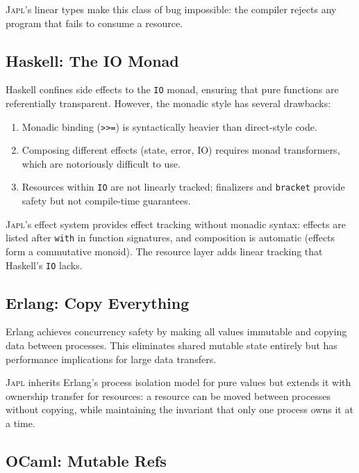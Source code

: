 \documentclass[11pt]{article}
\newcommand{\JAPL}{\textsc{Japl}}
\begin{document}
\JAPL{}'s linear types make this class of bug impossible: the
compiler rejects any program that fails to consume a resource.

\subsection{Haskell: The IO Monad}\label{sec:cmp-haskell}

Haskell confines side effects to the \texttt{IO} monad, ensuring that
pure functions are referentially transparent.  However, the monadic
style has several drawbacks:

\begin{enumerate}
  \item Monadic binding (\texttt{>>=}) is syntactically heavier than
        direct-style code.
  \item Composing different effects (state, error, IO) requires monad
        transformers, which are notoriously difficult to use.
  \item Resources within \texttt{IO} are not linearly tracked;
        finalizers and \texttt{bracket} provide safety but not
        compile-time guarantees.
\end{enumerate}

\JAPL{}'s effect system provides effect tracking without monadic
syntax: effects are listed after \texttt{with} in function signatures,
and composition is automatic (effects form a commutative monoid).
The resource layer adds linear tracking that Haskell's \texttt{IO}
lacks.

\subsection{Erlang: Copy Everything}\label{sec:cmp-erlang}

Erlang achieves concurrency safety by making all values immutable and
copying data between processes.  This eliminates shared mutable state
entirely but has performance implications for large data transfers.

\JAPL{} inherits Erlang's process isolation model for pure values but
extends it with ownership transfer for resources: a resource can be
moved between processes without copying, while maintaining the
invariant that only one process owns it at a time.

\subsection{OCaml: Mutable Refs}\label{sec:cmp-ocaml}
\end{document}
